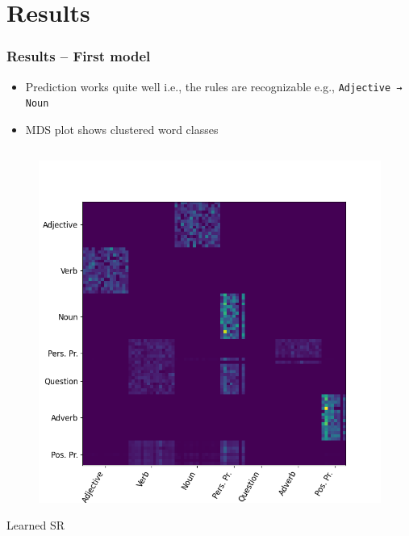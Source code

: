 \section{Results}


\begin{frame}
\frametitle{Results – First model}
	\begin{itemize}
		\item<+-> Prediction works quite well i.e., the rules are recognizable e.g., {\huge \texttt{Adjective → Noun}}
		\item<2-> MDS plot shows clustered word classes 
	\end{itemize}
    \vspace*{-0.95cm}
	\begin{columns}
		\begin{column}{0.33\textwidth}
			\begin{figure}
			\centering
				\includegraphics[height=0.98\columnwidth]{Bilder/results_first_model/8Rules/plots/First Model + More Rules_100E_100BS_1L_1C/Transition_Probability_Matrix;_t=1,_DF=0.5.png}
			\end{figure}
            \begin{center}
                {\large Learned SR}
            \end{center}

\end{column}
\end{columns}
\end{frame}
